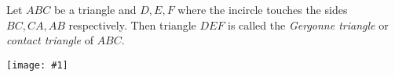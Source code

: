 \documentclass{article}
\newcommand{\figura}[1]{\begin{center}\texttt{[image: \#1]}\end{center}}
\begin{document}
Let $ABC$ be a triangle and $D,E,F$ where the incircle touches the sides $BC,CA,AB$ respectively. Then triangle $DEF$ is called the \emph{Gergonne triangle} or \emph{contact triangle} of $ABC$.
\figura{gergonne}
\end{document}
